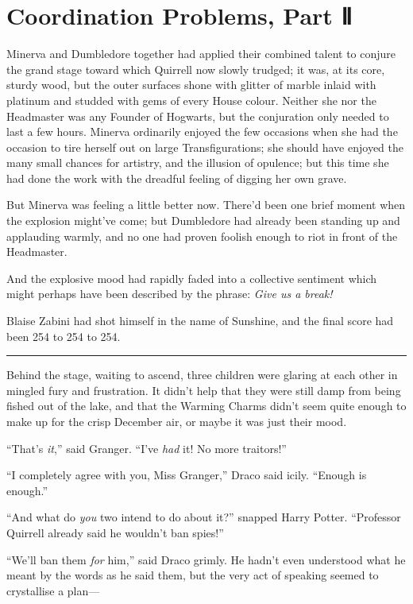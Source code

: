 \chapter{Coordination Problems, Part Ⅱ}

Minerva and Dumbledore together had applied their combined talent to
conjure the grand stage toward which Quirrell now slowly trudged; it
was, at its core, sturdy wood, but the outer surfaces shone with glitter
of marble inlaid with platinum and studded with gems of every House
colour. Neither she nor the Headmaster was any Founder of Hogwarts, but
the conjuration only needed to last a few hours. Minerva ordinarily
enjoyed the few occasions when she had the occasion to tire herself out
on large Transfigurations; she should have enjoyed the many small
chances for artistry, and the illusion of opulence; but this time she
had done the work with the dreadful feeling of digging her own grave.

But Minerva was feeling a little better now. There'd been one brief
moment when the explosion might've come; but Dumbledore had already been
standing up and applauding warmly, and no one had proven foolish enough
to riot in front of the Headmaster.

And the explosive mood had rapidly faded into a collective sentiment
which might perhaps have been described by the phrase: \emph{Give us a
break!}

Blaise Zabini had shot himself in the name of Sunshine, and the final
score had been 254 to 254 to 254.

\begin{center}\rule{3in}{0.4pt}\end{center}

Behind the stage, waiting to ascend, three children were glaring at each
other in mingled fury and frustration. It didn't help that they were
still damp from being fished out of the lake, and that the Warming
Charms didn't seem quite enough to make up for the crisp December air,
or maybe it was just their mood.

``That's \emph{it},'' said Granger. ``I've \emph{had} it! No more
traitors!''

``I completely agree with you, Miss Granger,'' Draco said icily.
``Enough is enough.''

``And what do \emph{you} two intend to do about it?'' snapped Harry
Potter. ``Professor Quirrell already said he wouldn't ban spies!''

``We'll ban them \emph{for} him,'' said Draco grimly. He hadn't even
understood what he meant by the words as he said them, but the very act
of speaking seemed to crystallise a plan---

